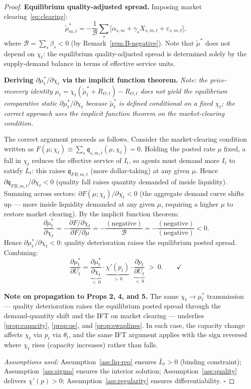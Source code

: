 \documentclass[12pt]{article}
\theoremstyle{definition}
\newcommand{\1}[1]{\mathds{1}\left[#1\right]}
\begin{document}
\begin{proof}
  \textbf{Equilibrium quality-adjusted spread.} Imposing market
  clearing~\eqref{eq:clearing}:
  \[
    \tilde{\mu}_{m,t}^* = -\frac{1}{\mathcal{B}}\sum_s \bigl[\alpha_{s,m} +
    \gamma_s X_{s,m,t} + \varepsilon_{s,m,t}\bigr],
  \]
  where $\mathcal{B} = \sum_s \beta_s < 0$ (by Remark~\ref{rem:B-negative}).
  Note that $\tilde{\mu}^*$ does not depend on $\chi_t$: the equilibrium
  quality-adjusted spread is determined solely by the supply-demand balance in
  terms of effective service units.

  \textbf{Deriving $\partial\mu_t^*/\partial\chi_t$ via the implicit function theorem.}
  \emph{Note: the price-recovery identity $\mu_t = \chi_t(\tilde\mu_t^* + R_{O,t})
  - R_{O,t}$ does not yield the equilibrium comparative static
  $\partial\mu_t^*/\partial\chi_t$ because $\tilde\mu_t^*$ is defined conditional
  on a fixed $\chi_t$; the correct approach uses the implicit function theorem on
  the market-clearing condition.}

  The correct argument proceeds as follows. Consider the market-clearing condition
  written as $F(\mu;\chi_t) \equiv \sum_s \mathfrak{q}_{s,m,t}(\mu,\chi_t) = 0$.
  Holding the posted rate $\mu$ fixed, a fall in $\chi_t$ reduces the effective
  service of $I_t$, so agents must demand more $I_t$ to satisfy $\bar{L}_t$:
  this raises $\mathfrak{q}_{FB,m,t}$ (more dollar-taking) at any given $\mu$.
  Hence $\partial\mathfrak{q}_{FB,m,t}/\partial\chi_t < 0$ (quality fall raises
  quantity demanded of inside liquidity). Summing across sectors:
  $\partial F(\mu;\chi_t)/\partial\chi_t < 0$ (the aggregate demand curve shifts
  up --- more inside liquidity demanded at any given $\mu$, requiring a higher
  $\mu$ to restore market clearing). By the implicit function theorem:
  \[
    \frac{\partial\mu_t^*}{\partial\chi_t}
    = -\frac{\partial F/\partial\chi_t}{\partial F/\partial\mu}
    = -\frac{(\text{negative})}{\mathcal{B}} = -\frac{(\text{negative})}{(\text{negative})}
    < 0.
  \]
  Hence $\partial\mu_t^*/\partial\chi_t < 0$: quality deterioration raises
  the equilibrium posted spread. Combining:
  \[
    \frac{\partial\mu_t^*}{\partial U_t}
    = \underbrace{\frac{\partial\mu_t^*}{\partial\chi_t}}_{<\,0}
      \cdot\underbrace{\chi'(p_t)}_{>\,0}
      \cdot\underbrace{\frac{\partial p_t}{\partial U_t}}_{<\,0}
    \;>\; 0. \qquad \checkmark
  \]

  \textbf{Note on propagation to Props 2, 4, and 5.} The same
  $\chi_t \to \mu_t^*$ transmission — quality deterioration raises the
  equilibrium posted spread through the demand-quantity shift and the IFT on
  market clearing — underlies \cref{prop:capacity}, \cref{prop:qe}, and
  \cref{prop:swaplines}. In each case, the capacity change affects $\chi_t$
  via $p_t$ via $\theta_t$, and the same IFT argument applies with the sign
  reversed where $\chi_t$ rises (capacity increases) rather than falls.

  \textit{Assumptions used:} Assumption~\ref{ass:liq-req} ensures $\bar{L}_t >
  0$ (binding constraint); Assumption~\ref{ass:sigma} ensures the interior
  solution; Assumption~\ref{ass:quality} delivers $\chi'(p) > 0$;
  Assumption~\ref{ass:regularity} ensures differentiability.
  \hfill$\square$
\end{proof}
\end{document}
